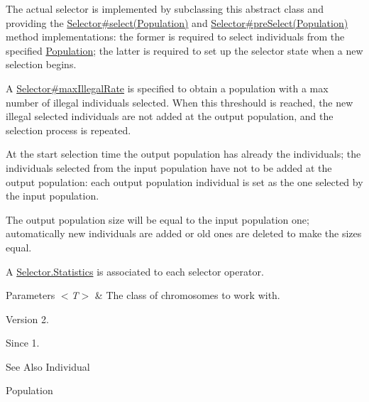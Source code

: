 The actual selector is implemented by subclassing this abstract class and providing the \hyperlink{}{Selector\#select(\-Population)} and \hyperlink{}{Selector\#pre\-Select(\-Population)} method implementations\-: the former is required to select individuals from the specified \hyperlink{}{Population}; the latter is required to set up the selector state when a new selection begins. 

A \hyperlink{}{Selector\#max\-Illegal\-Rate} is specified to obtain a population with a max number of illegal individuals selected. When this threshould is reached, the new illegal selected individuals are not added at the output population, and the selection process is repeated. 

At the start selection time the output population has already the individuals; the individuals selected from the input population have not to be added at the output population\-: each output population individual is set as the one selected by the input population. 

The output population size will be equal to the input population one; automatically new individuals are added or old ones are deleted to make the sizes equal. 

A \hyperlink{}{Selector.\-Statistics} is associated to each selector operator.


\begin{DoxyParams}{Parameters}
{\em $<$\-T$>$} & The class of chromosomes to work with.\\
\hline
\end{DoxyParams}
\begin{DoxyVersion}{Version}
2. 
\end{DoxyVersion}
\begin{DoxySince}{Since}
1.
\end{DoxySince}
\begin{DoxySeeAlso}{See Also}
Individual 

Population 
\end{DoxySeeAlso}


